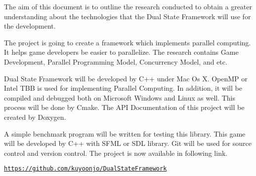 \begin{DoxyParagraph}{}
The aim of this document is to outline the research conducted to obtain a greater understanding about the technologies that the Dual State Framework will use for the development. 
\end{DoxyParagraph}
\begin{DoxyParagraph}{}
The project is going to create a framework which implements parallel computing. It helps game developers be easier to parallelize. The research contains Game Development, Parallel Programming Model, Concurrency Model, and etc. 
\end{DoxyParagraph}
\begin{DoxyParagraph}{}
Dual State Framework will be developed by C++ under Mac Os X. Open\+M\+P or Intel T\+B\+B is used for implementing Parallel Computing. In addition, it will be compiled and debugged both on Microsoft Windows and Linux as well. This process will be done by Cmake. The A\+P\+I Documentation of this project will be created by Doxygen. 
\end{DoxyParagraph}
\begin{DoxyParagraph}{}
A simple benchmark program will be written for testing this library. This game will be developed by C++ with S\+F\+M\+L or S\+D\+L library. Git will be used for source control and version control. The project is now available in following link. 
\end{DoxyParagraph}
\begin{DoxyParagraph}{}
\href{https://github.com/kuyoonjo/DualStateFramework}{\tt https\+://github.\+com/kuyoonjo/\+Dual\+State\+Framework} 
\end{DoxyParagraph}
